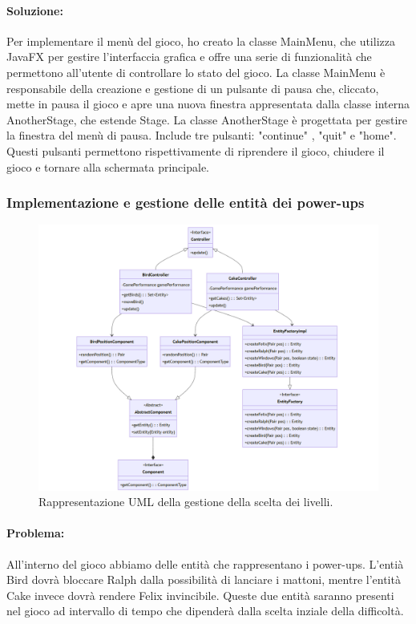 \documentclass[a4paper,12pt]{report}
\begin{document}
\paragraph{Soluzione:}
Per implementare il menù del gioco, ho creato la classe MainMenu, che utilizza JavaFX per gestire l'interfaccia grafica e offre una serie di funzionalità che permettono all'utente di controllare lo stato del gioco. 
La classe MainMenu è responsabile della creazione e gestione di un pulsante di pausa che, cliccato, mette in pausa il gioco e apre una nuova finestra appresentata dalla classe interna AnotherStage, che estende Stage. 
La classe AnotherStage è progettata per gestire la finestra del menù di pausa. 
Include tre pulsanti: "continue" , "quit" e "home". 
Questi pulsanti permettono rispettivamente di riprendere il gioco, chiudere il gioco e tornare alla schermata principale. 


\subsubsection{Implementazione e gestione delle entità dei power-ups}

\begin{figure}[H]
\centering{}
\includegraphics[width=\textwidth]{img/powerups.png}
\caption{Rappresentazione UML della gestione della scelta dei livelli.}
\end{figure}

\paragraph{Problema:}
All'interno del gioco abbiamo delle entità che rappresentano i power-ups. 
L'entià Bird dovrà bloccare Ralph dalla possibilità di lanciare i mattoni, mentre l'entità Cake invece dovrà rendere Felix invincibile. 
Queste due entità saranno presenti nel gioco ad intervallo di tempo che dipenderà dalla scelta inziale della difficoltà. 
\end{document}
